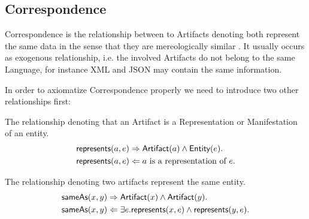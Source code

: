 \subsection{Correspondence}
\label{subsection:Correspondence}
\Gls{Correspondence} is the relationship between to \glspl{Artifact} denoting both represent the same data in the sense that they are mereologically similar \cite{HeinzLV17}.
It usually occurs as exogenous relationship, i.e. the involved \glspl{Artifact} do not belong to the same \gls{Language}, for instance \gls{XML} and \gls{JSON} may contain the same information.

In order to axiomatize \gls{Correspondence} properly we need to introduce two other relationships first:
\begin{description}[align=left]
\item[\represents]
The relationship denoting that an \gls{Artifact} is a \gls{Representation} or \gls{Manifestation} of an entity.
\begin{align*}
&\textsf{represents}(a,e)
\Rightarrow
\textsf{Artifact}(a) \wedge \textsf{Entity}(e).\\
&\textsf{represents}(a,e)
\Leftarrow
a \text{ is a representation of } e.
\end{align*}

\item[\sameAs]
The relationship denoting two artifacts represent the same entity.
\begin{align*}
&\textsf{sameAs}(x,y)
\Rightarrow
\textsf{Artifact}(x) \wedge \textsf{Artifact}(y).\\
&\textsf{sameAs}(x,y)
\Leftarrow
\exists e.\textsf{represents}(x,e) \wedge \textsf{represents}(y,e).
\end{align*}
\end{description}

